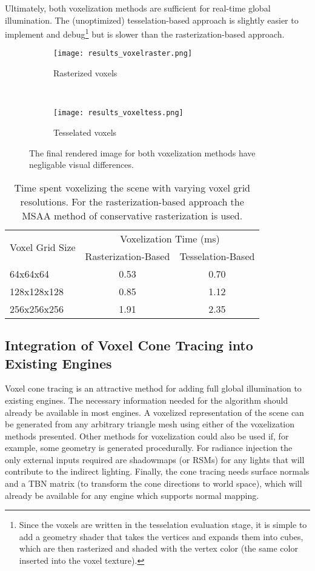 Ultimately, both voxelization methods are sufficient for real-time global illumination. The (unoptimized) tesselation-based approach is slightly easier to implement and debug\footnote{Since the voxels are written in the tesselation evaluation stage, it is simple to add a geometry shader that takes the vertices and expands them into cubes, which are then rasterized and shaded with the vertex color (the same color inserted into the voxel texture).} but is slower than the rasterization-based approach.

\begin{figure}[h!]
\centering
    \begin{subfigure}[t]{0.4\textwidth}
        \texttt{[image: results\_voxelraster.png]}
        \caption{Rasterized voxels}
    \end{subfigure}
    ~
    \begin{subfigure}[t]{0.4\textwidth}
        \texttt{[image: results\_voxeltess.png]}
        \caption{Tesselated voxels}
    \end{subfigure}
    \caption{The final rendered image for both voxelization methods have negligable visual differences.}
    \label{fig:results_voxelization}
\end{figure}

\begin{table}[H]
\centering
\begin{tabular}{lcc}
\toprule
\multirow{2}{*}{Voxel Grid Size} & \multicolumn{2}{c}{Voxelization Time (ms)} \\
& Rasterization-Based & Tesselation-Based \\
\midrule
64x64x64        & 0.53 & 0.70\\
128x128x128     & 0.85 & 1.12\\
256x256x256     & 1.91 & 2.35\\
\bottomrule
\end{tabular}
\caption{Time spent voxelizing the scene with varying voxel grid resolutions. For the rasterization-based approach the MSAA method of conservative rasterization is used.}
\label{tbl:voxelizationtiming}
\end{table}

\subsection{Integration of Voxel Cone Tracing into Existing Engines}
Voxel cone tracing is an attractive method for adding full global illumination to existing engines. The necessary information needed for the algorithm should already be available in most engines. A voxelized representation of the scene can be generated from any arbitrary triangle mesh using either of the voxelization methods presented. Other methods for voxelization could also be used if, for example, some geometry is generated procedurally. For radiance injection the only external inputs required are shadowmaps (or RSMs) for any lights that will contribute to the indirect lighting. Finally, the cone tracing needs surface normals and a TBN matrix (to transform the cone directions to world space), which will already be available for any engine which supports normal mapping.


